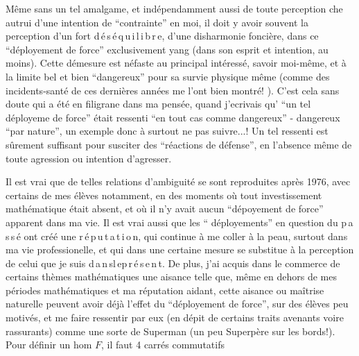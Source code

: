 Même sans un tel amalgame, et indépendamment aussi de toute perception che autrui d'une intention de ``contrainte'' en moi, il doit y avoir souvent la perception d'un fort d\,é\,s\,é\,q\,u\,i\,l\,i\,b\,r\,e, d'une disharmonie foncière, dans ce ``déployement de force'' exclusivement yang (dans son esprit et intention, au moins). Cette démesure est néfaste au principal intéressé, savoir moi-même, et à la limite bel et bien ``dangereux'' pour sa survie physique même (comme des incidents-santé de ces dernières années me l'ont bien montré! ). C'est cela sans doute qui a été en filigrane dans ma pensée, quand j'ecrivais qu' ``un tel déployeme de force'' était ressenti ``en tout cas comme dangereux'' - dangereux ``par nature'', un exemple donc à surtout ne pas suivre...! Un tel ressenti est sûrement suffisant pour susciter des ``réactions de défense'', en l'absence même de toute agression ou intention d'agresser.

Il est vrai que de telles relations d'ambiguité se sont reproduites après 1976, avec certains de mes élèves notamment, en des moments où tout investissement mathématique était absent, et où il n'y avait aucun ``dépoyement de force'' apparent dans ma vie. Il est vrai aussi que les `` déployements'' en question du p\,a\,s\,s\,é ont créé une r\,é\,p\,u\,t\,a\,t\,i\,o\,n, qui continue à me coller à la peau, surtout dans ma vie professionelle, et qui dans une certaine mesure se substitue à la perception de celui que je suis d\,a\,n\,s\quad l\,e\quad p\,r\,é\,s\,e\,n\,t. De plus, j'ai acquis dans le commerce de certains thèmes mathématiques une aisance telle que, même en dehors de mes périodes mathématiques et ma réputation aidant, cette aisance ou maîtrise naturelle peuvent avoir déjà l'effet du ``déployement de force'', sur des élèves peu motivés, et me faire ressentir par eux (en dépit de certains traits avenants voire rassurants) comme une sorte de Superman (un peu Superpère sur les bords!).\margin{\unsure{-}}
Pour définir un hom $F$, il faut 
 4 carrés commutatifs

